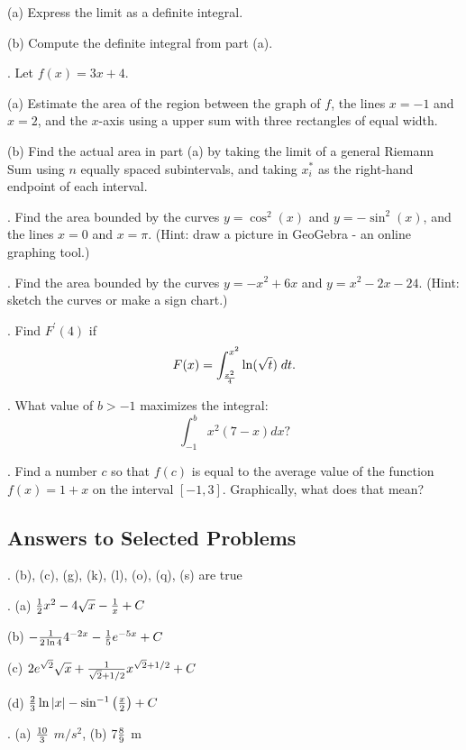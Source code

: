 \documentclass[12pt]{article}
\begin{document}
\noindent (a) Express the limit as a definite integral.

\noindent (b)  Compute the definite integral from part (a).

\bigskip
{}.  Let $f(x) = 3x+4$.

\noindent (a) Estimate the area of the region between the graph of $f$, the lines 
$x=-1$ and $x=2$,  and the 
$x$-axis using a upper sum with three rectangles of equal width.

\noindent (b) Find the actual area in part (a) by taking the limit of a general 
Riemann Sum
using $n$ equally spaced subintervals, and taking $x^{*}_i$ as the right-hand 
endpoint of each interval.

\bigskip
{}. Find the area bounded by the curves $y=\cos^2(x)$ and $y=-\sin^2(x)$, 
and the 
lines $x=0$ and $x=\pi$. (Hint: draw a picture in GeoGebra - an online 
graphing tool.)

\bigskip
{}. Find the area bounded by the curves $y=-x^2+6x$ and $y=x^2-2x-24$. 
(Hint: sketch the curves or make a sign chart.)

\bigskip
{}. Find $F^{\prime}(4)$ if $$F(x) = 
\int_{{x^2}\over{4}}^{x^2} \ln (\sqrt{t}) \; dt.$$

\bigskip
{}. What value of $b > -1$ maximizes the integral:
$$\int_{-1}^b x^2(7-x) dx?$$

\bigskip
{}.  Find a number $c$ so that $f(c)$ is equal to the average 
value of the function $f(x) = 1 + x$ on the interval $[-1,3]$.  
Graphically, what does that mean?

\vskip 1in

\subsection*{Answers to Selected Problems}

.  (b), (c), (g), (k), (l), (o), (q), (s) are true

.  (a) ${{1}\over{2}} x^2 - 4 \sqrt{x} - {{1}\over{x}} + C$

\noindent (b) $-{{1}\over{2 \ln 4}} 4^{-2x} -{{1}\over{5}} e^{-5x} + C$

\noindent (c)  $2 e^{\sqrt{2}} \sqrt{x} + {{1}\over{\sqrt{2}+1/2}} 
x^{\sqrt{2}+1/2} + C$

\noindent (d) ${{2}\over{3}} \ln |x| - \sin^{-1} \left ( {{x}\over{2}} 
\right ) + C$

.  (a) ${{10}\over{3}}$ $m/s^2$, (b) $7 {{8}\over{9}}$ m
\end{document}
